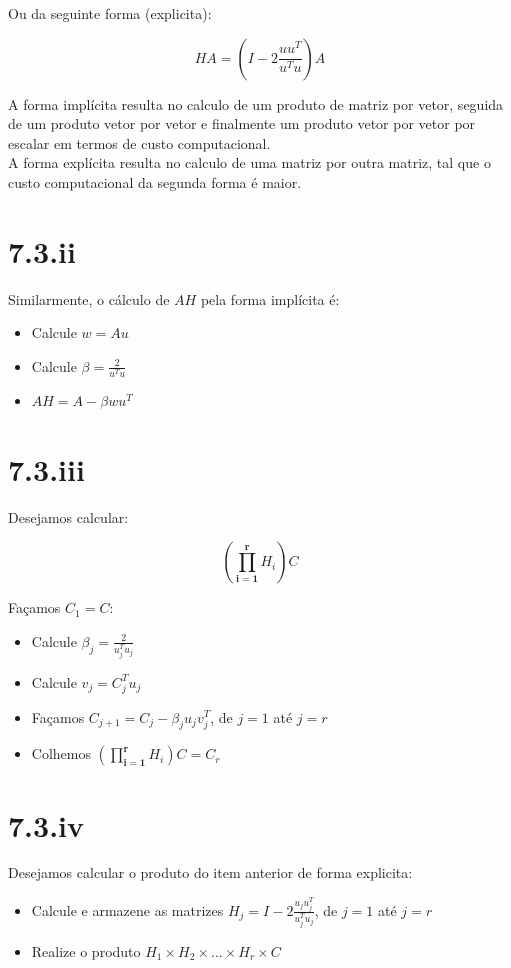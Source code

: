 \documentclass[11pt]{report}
\begin{document}
Ou da seguinte forma (explicita):

\[
HA = (I - 2\frac{uu^T}{u^Tu}) A
\]

A forma implícita resulta no calculo de um produto de matriz por vetor, seguida de um produto vetor por vetor e finalmente um produto vetor por vetor por escalar em termos de custo computacional.\\

A forma explícita resulta no calculo de uma matriz por outra matriz, tal que o custo computacional da segunda forma é maior.

\section*{7.3.ii}

Similarmente, o cálculo de $AH$ pela forma implícita é:

\begin{itemize}
\item[i)] Calcule $w = Au$
\item[ii)] Calcule $\beta = \frac{2}{u^Tu}$
\item[iii)] $AH = A-\beta wu^T$
\end{itemize}

\section*{7.3.iii}

Desejamos calcular: 

\[
(\mathbf{\prod_{i=1}^{r}}H_i) C
\]

Façamos $C_1 = C$:

\begin{itemize} 
\item[i)] Calcule $\beta_j = \frac{2}{u_j^Tu_j}$
\item[ii)] Calcule $v_j = C_j^T u_j$
\item[iii)] Façamos $C_{j+1} = C_j - \beta_j u_j v_j^T$, de $j=1$ até $j=r$
\item[iv)] Colhemos $(\mathbf{\prod_{i=1}^{r}}H_i) C = C_r$
\end{itemize}

\section*{7.3.iv}

Desejamos calcular o produto do item anterior de forma explicita:

\begin{itemize}
\item[i)] Calcule e armazene as matrizes $H_j = I - 2\frac{u_ju_j^T}{u_j^T u_j}$, de $j=1$ até $j=r$
\item[ii)] Realize o produto $H_1\times H_2\times...\times H_r\times C$
\end{itemize}
\end{document}
